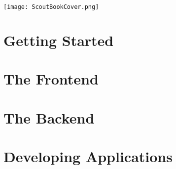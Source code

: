 \documentclass[a4paper,10pt,twoside]{book}
\begin{document}
\ifpdf
  
\else
  \texttt{[image: ScoutBookCover.png]}
\fi

\thispagestyle{empty}
\frontmatter




\pagestyle{plain}

\tableofcontents
\sloppy


\mainmatter


\pagestyle{headings}

\part{Getting Started}





\part{The Frontend}


\part{The Backend}


\part{Developing Applications}





\end{document}
